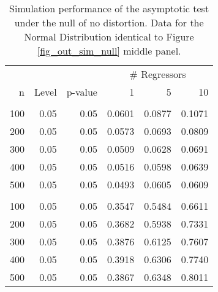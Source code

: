 \begin{table}
\small
\caption{Simulation performance of the asymptotic test under the null of no distortion. Data for the Normal Distribution identical to Figure \ref{fig_out_sim_null} middle panel.}
\label{fig_out_sim_null_tabmid}
 \parbox{0.99\textwidth}{
\centering
\begin{tabular}{rrrrrr}
\toprule
\multicolumn{3}{c}{ } & \multicolumn{3}{c}{\# Regressors} \\
\cmidrule(l{3pt}r{3pt}){4-6}
n & Level & p-value & 1 & 5 & 10\\
\midrule
\addlinespace[0.3em]
\multicolumn{6}{l}{\textbf{Normal Distribution}}\\
\hspace{1em}100 & 0.05 & 0.05 & 0.0601 & 0.0877 & 0.1071\\
\hspace{1em}200 & 0.05 & 0.05 & 0.0573 & 0.0693 & 0.0809\\
\hspace{1em}300 & 0.05 & 0.05 & 0.0509 & 0.0628 & 0.0691\\
\hspace{1em}400 & 0.05 & 0.05 & 0.0516 & 0.0598 & 0.0639\\
\hspace{1em}500 & 0.05 & 0.05 & 0.0493 & 0.0605 & 0.0609\\
\addlinespace[0.3em]
\multicolumn{6}{l}{\textbf{$t_3$ Distribution}}\\
\hspace{1em}100 & 0.05 & 0.05 & 0.3547 & 0.5484 & 0.6611\\
\hspace{1em}200 & 0.05 & 0.05 & 0.3682 & 0.5938 & 0.7331\\
\hspace{1em}300 & 0.05 & 0.05 & 0.3876 & 0.6125 & 0.7607\\
\hspace{1em}400 & 0.05 & 0.05 & 0.3918 & 0.6306 & 0.7740\\
\hspace{1em}500 & 0.05 & 0.05 & 0.3867 & 0.6348 & 0.8011\\
\bottomrule
\end{tabular}
}
 \end{table}
